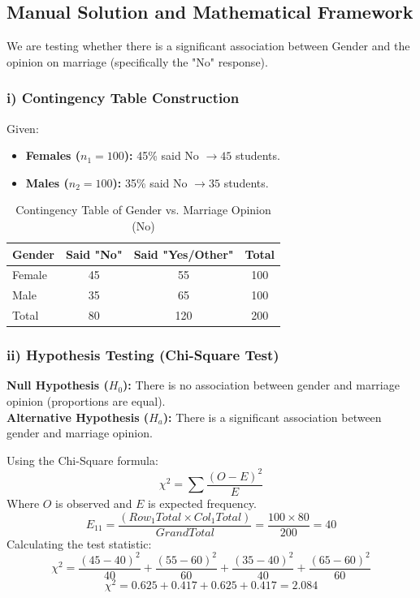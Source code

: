 \documentclass[12pt]{article}
\begin{document}
\subsection{Manual Solution and Mathematical Framework}
We are testing whether there is a significant association between Gender and the opinion on marriage (specifically the "No" response).

\subsubsection{i) Contingency Table Construction}
Given:
\begin{itemize}
    \item \textbf{Females ($n_1 = 100$):} 45\% said No $\rightarrow 45$ students.
    \item \textbf{Males ($n_2 = 100$):} 35\% said No $\rightarrow 35$ students.
\end{itemize}

\begin{table}[h!]
\centering
\caption{Contingency Table of Gender vs. Marriage Opinion (No)}
\begin{tabular}{@{}lccc@{}}
\toprule
Gender & Said "No" & Said "Yes/Other" & Total \\ \midrule
Female & 45 & 55 & 100 \\
Male & 35 & 65 & 100 \\ \midrule
Total & 80 & 120 & 200 \\ \bottomrule
\end{tabular}
\end{table}

\subsubsection{ii) Hypothesis Testing (Chi-Square Test)}
\textbf{Null Hypothesis ($H_0$):} There is no association between gender and marriage opinion (proportions are equal). \\
\textbf{Alternative Hypothesis ($H_a$):} There is a significant association between gender and marriage opinion.

Using the Chi-Square formula:
\[ \chi^2 = \sum \frac{(O - E)^2}{E} \]
Where $O$ is observed and $E$ is expected frequency.
\[ E_{11} = \frac{(Row_1 Total \times Col_1 Total)}{Grand Total} = \frac{100 \times 80}{200} = 40 \]
Calculating the test statistic:
\[ \chi^2 = \frac{(45-40)^2}{40} + \frac{(55-60)^2}{60} + \frac{(35-40)^2}{40} + \frac{(65-60)^2}{60} \]
\[ \chi^2 = 0.625 + 0.417 + 0.625 + 0.417 = 2.084 \]
\end{document}
